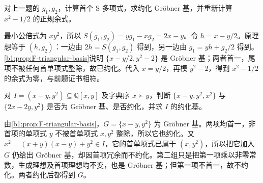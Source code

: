 \begin{exercise}\label{b1:ex:F-complete-second-example}
	对上一题的 \(g_1,g_2\)，计算首个 S 多项式，求约化 Gröbner 基，并重新计算 \(x^2-1/2\) 的正规余式。
\end{exercise}
\begin{solution}
	最小公倍式为 \(xy^2\)，所以 \(S(g_1,g_2)=yg_1-xg_2=2x-y\)。令 \(h=x-y/2\)。原理想等于 \((h,g_2)\)：一边由 \(2h=S(g_1,g_2)\) 得到，另一边由 \(g_1=yh+g_2/2\) 得到。\cref{b1:prop:F-triangular-basis}说明 \(\{x-y/2,y^2-2\}\) 是 Gröbner 基；两者首一，尾项不被任何首单项式整除，故已约化。代入 \(x=y/2\)，再模 \(y^2-2\)，得到 \(x^2-1/2\) 的余式为零，与前题证书相符。
\end{solution}

\begin{exercise}\label{b1:ex:F-reduced-versus-redundant}
	对 \(I=(x-y,y^2)\subseteq\mathbb Q[x,y]\) 及字典序 \(x\succ y\)，判断 \(\{x-y,y^2,x^2\}\) 与 \(\{2x-2y,y^2\}\) 是否为 Gröbner 基、是否约化，并求 \(I\) 的约化基。
\end{exercise}
\begin{solution}
	由\cref{b1:prop:F-triangular-basis}，\(G=\{x-y,y^2\}\) 为 Gröbner 基。两项均首一，非首项的单项式 \(y\) 不被首单项式 \(x,y^2\) 整除，所以它也约化。又 \(x^2=(x+y)(x-y)+y^2\in I\)，它的首单项式已属于 \((x,y^2)\)，所以把它加入 \(G\) 仍给出 Gröbner 基，却因首项冗余而不约化。第二组只是把第一项乘以非零常数，生成理想及首项理想均不变，也是 Gröbner 基；但第一项不首一，故不约化。两者约化后都得到 \(G\)。
\end{solution}

